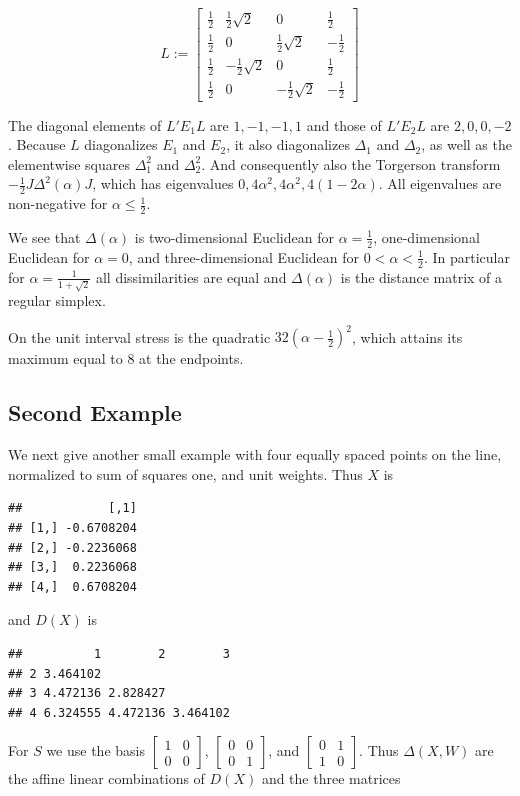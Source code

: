\documentclass[
  12pt,
]{book}
\theoremstyle{definition}
\theoremstyle{definition}
\theoremstyle{definition}
\theoremstyle{definition}
\theoremstyle{remark}
\begin{document}
\[
L:=\begin{bmatrix}
\frac12&\frac12\sqrt{2}&0&\frac12\\
\frac12&0&\frac12\sqrt{2}&-\frac12\\
\frac12&-\frac12\sqrt{2}&0&\frac12\\
\frac12&0&-\frac12\sqrt{2}&-\frac12
\end{bmatrix}
\]

The diagonal elements of \(L'E_1L\) are \(1,-1,-1,1\) and those of \(L'E_2 L\) are \(2,0,0,-2\). Because \(L\) diagonalizes \(E_1\) and \(E_2\), it also diagonalizes \(\Delta_1\) and \(\Delta_2\), as well as the elementwise squares \(\Delta^2_1\) and \(\Delta^2_2\). And consequently also the Torgerson transform \(-\frac12 J\Delta^2(\alpha)J\), which has eigenvalues \(0,4\alpha^2,4\alpha^2,4(1-2\alpha)\). All eigenvalues are non-negative for \(\alpha\leq\frac12\).

We see that
\(\Delta(\alpha)\) is two-dimensional Euclidean for \(\alpha=\frac12\), one-dimensional Euclidean for \(\alpha=0\), and three-dimensional Euclidean for \(0<\alpha<\frac12\). In particular for \(\alpha=\frac{1}{1+\sqrt{2}}\) all dissimilarities are equal and \(\Delta(\alpha)\) is the distance matrix of a regular simplex.

On the unit interval stress is the quadratic \(32(\alpha-\frac12)^2\), which attains its maximum equal to 8 at the endpoints.

\hypertarget{second-example}{%
\subsection{Second Example}\label{second-example}}

We next give another small example with four equally spaced points on the line, normalized to sum of squares one, and unit weights. Thus \(X\) is

\begin{verbatim}
##            [,1]
## [1,] -0.6708204
## [2,] -0.2236068
## [3,]  0.2236068
## [4,]  0.6708204
\end{verbatim}

and \(D(X)\) is

\begin{verbatim}
##          1        2        3
## 2 3.464102                  
## 3 4.472136 2.828427         
## 4 6.324555 4.472136 3.464102
\end{verbatim}

For \(S\) we use the basis \(\begin{bmatrix}1&0\\0&0\end{bmatrix}\), \(\begin{bmatrix}0&0\\0&1\end{bmatrix}\), and \(\begin{bmatrix}0&1\\1&0\end{bmatrix}\). Thus \(\Delta(X,W)\) are the affine linear combinations of \(D(X)\) and
the three matrices
\end{document}
